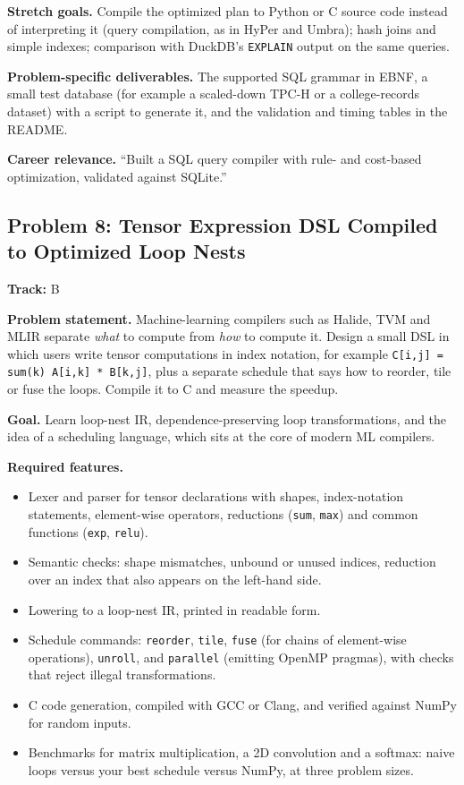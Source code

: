 \documentclass[11pt,a4paper]{article}
\newcommand{\fld}[1]{\par\smallskip\textbf{\color{accent}#1}\quad}
\newcommand{\meta}[1]{%
  \begin{tcolorbox}[colback=softbg,colframe=softbg,boxsep=2pt,left=4pt,right=4pt,top=2pt,bottom=2pt,arc=2pt]
  \small\textbf{Track:} #1
  \end{tcolorbox}}
\begin{document}
\fld{Stretch goals.} Compile the optimized plan to Python or C source code instead of interpreting it
(query compilation, as in HyPer and Umbra); hash joins and simple indexes; comparison with DuckDB's
\texttt{EXPLAIN} output on the same queries.

\fld{Problem-specific deliverables.} The supported SQL grammar in EBNF, a small test database (for
example a scaled-down TPC-H or a college-records dataset) with a script to generate it, and the
validation and timing tables in the README.

\fld{Career relevance.} ``Built a SQL query compiler with rule- and cost-based optimization, validated against SQLite.''

\subsection{Problem 8: Tensor Expression DSL Compiled to Optimized Loop Nests}
\meta{B}

\fld{Problem statement.} Machine-learning compilers such as Halide, TVM and MLIR separate
\emph{what} to compute from \emph{how} to compute it. Design a small DSL in which users write tensor
computations in index notation, for example \texttt{C[i,j] = sum(k) A[i,k] * B[k,j]}, plus a
separate schedule that says how to reorder, tile or fuse the loops. Compile it to C and measure the speedup.

\fld{Goal.} Learn loop-nest IR, dependence-preserving loop transformations, and the idea of a
scheduling language, which sits at the core of modern ML compilers.

\fld{Required features.}
\begin{itemize}
  \item Lexer and parser for tensor declarations with shapes, index-notation statements, element-wise
  operators, reductions (\texttt{sum}, \texttt{max}) and common functions (\texttt{exp}, \texttt{relu}).
  \item Semantic checks: shape mismatches, unbound or unused indices, reduction over an index that also appears on the left-hand side.
  \item Lowering to a loop-nest IR, printed in readable form.
  \item Schedule commands: \texttt{reorder}, \texttt{tile}, \texttt{fuse} (for chains of element-wise
  operations), \texttt{unroll}, and \texttt{parallel} (emitting OpenMP pragmas), with checks that reject illegal transformations.
  \item C code generation, compiled with GCC or Clang, and verified against NumPy for random inputs.
  \item Benchmarks for matrix multiplication, a 2D convolution and a softmax: naive loops versus your
  best schedule versus NumPy, at three problem sizes.
\end{itemize}
\end{document}
